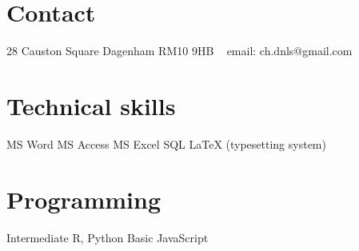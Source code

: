 \documentclass[print, oneside]{friggeri-cv} %
\begin{document}

\begin{aside} %
\section{Contact}
28 Causton Square
Dagenham
RM10 9HB
~
email: ch.dnls@gmail.com
\section{Technical skills}
MS Word
MS Access
MS Excel
SQL
LaTeX (typesetting system)
\section{Programming}
Intermediate
R, Python
Basic
JavaScript
\end{aside}

\end{document}
